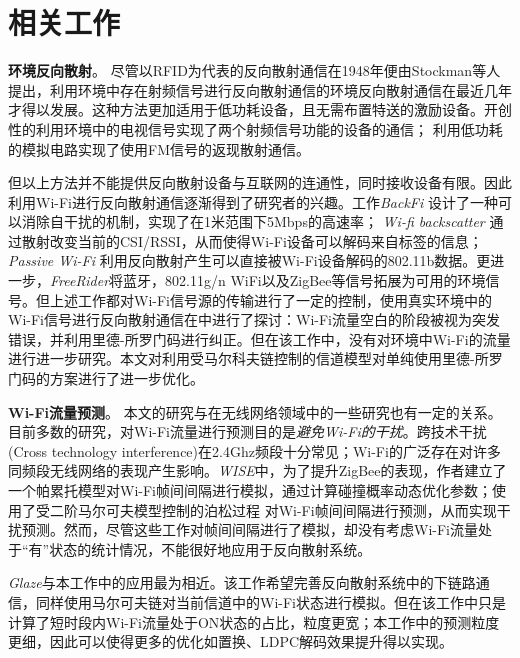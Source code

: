 
\chapter{相关工作}
\label{chap:related}

\textbf{环境反向散射}。
尽管以RFID为代表的反向散射通信在1948年便由Stockman等人提出\cite{}，利用环境中存在射频信号进行反向散射通信的环境反向散射通信在最近几年才得以发展。这种方法更加适用于低功耗设备，且无需布置特送的激励设备。\cite{}开创性的利用环境中的电视信号实现了两个射频信号功能的设备的通信；
\cite{}%
利用低功耗的模拟电路实现了使用FM信号的返现散射通信。

但以上方法并不能提供反向散射设备与互联网的连通性，同时接收设备有限。因此利用Wi-Fi进行反向散射通信逐渐得到了研究者的兴趣。工作\textit{BackFi}
\cite{} %
设计了一种可以消除自干扰的机制，实现了在1米范围下5Mbps的高速率；
\textit{Wi-fi backscatter}\cite{}%
通过散射改变当前的CSI/RSSI，从而使得Wi-Fi设备可以解码来自标签的信息；
\textit{Passive Wi-Fi}\cite{}%
利用反向散射产生可以直接被Wi-Fi设备解码的802.11b数据。更进一步，\textit{FreeRider}\cite{}将蓝牙，802.11g/n WiFi以及ZigBee等信号拓展为可用的环境信号。但上述工作都对Wi-Fi信号源的传输进行了一定的控制，使用真实环境中的Wi-Fi信号进行反向散射通信在\cite{}中进行了探讨：Wi-Fi流量空白的阶段被视为突发错误，并利用里德-所罗门码进行纠正。但在该工作中，没有对环境中Wi-Fi的流量进行进一步研究。本文对利用受马尔科夫链控制的信道模型对单纯使用里德-所罗门码的方案进行了进一步优化。

\textbf{Wi-Fi流量预测}。
本文的研究与在无线网络领域中的一些研究也有一定的关系。目前多数的研究，对Wi-Fi流量进行预测目的是\emph{避免Wi-Fi的干扰}。跨技术干扰(Cross technology interference)在2.4Ghz频段十分常见；Wi-Fi的广泛存在对许多同频段无线网络的表现产生影响。\textit{WISE}\cite{}中，为了提升ZigBee的表现，作者建立了一个帕累托模型对Wi-Fi帧间间隔进行模拟，通过计算碰撞概率动态优化参数；\cite{}使用了受二阶马尔可夫模型控制的泊松过程
对Wi-Fi帧间间隔进行预测，从而实现干扰预测。然而，尽管这些工作对帧间间隔进行了模拟，却没有考虑Wi-Fi流量处于“有”状态的统计情况，不能很好地应用于反向散射系统。

\textit{Glaze}\cite{}与本工作中的应用最为相近。该工作希望完善反向散射系统中的下链路通信，同样使用马尔可夫链对当前信道中的Wi-Fi状态进行模拟。但在该工作中只是计算了短时段内Wi-Fi流量处于ON状态的占比，粒度更宽；本工作中的预测粒度更细，因此可以使得更多的优化如置换、LDPC解码效果提升得以实现。
